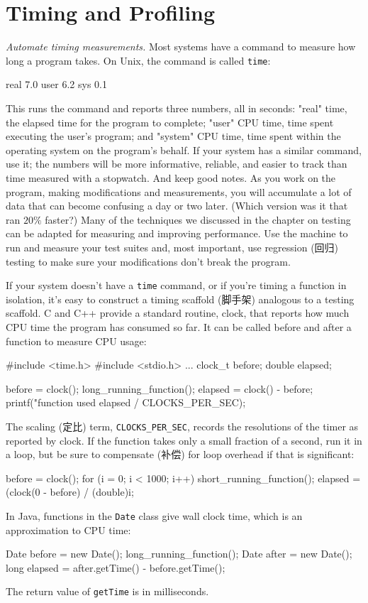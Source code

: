 \section{Timing and Profiling}
\emph{Automate timing measurements.} Most systems have a command to measure
how long a program takes. On Unix, the command is called \verb'time':
\begin{wellcode}
    real    7.0
    user    6.2
    sys     0.1
\end{wellcode}
This runs the command and reports three numbers, all in seconds: "real"
time, the elapsed time for the program to complete; "user" CPU time, time
spent executing the user's program; and "system" CPU time, time spent
within the operating system on the program's behalf. If your system has a
similar command, use it; the numbers will be more informative, reliable,
and easier to track than time measured with a stopwatch. And keep good
notes. As you work on the program, making modifications and measurements,
you will accumulate a lot of data that can become confusing a day or two
later. (Which version was it that ran $20\%$ faster?) Many of the
techniques we discussed in the chapter on testing can be adapted for
measuring and improving performance. Use the machine to run and measure
your test suites and, most important, use regression (回归) testing to make
sure your modifications don't break the program.

If your system doesn't have a \verb'time' command, or if you're timing a
function in isolation, it's easy to construct a timing scaffold (脚手架)
analogous to a testing scaffold. C and C++ provide a standard routine,
clock, that reports how much CPU time the program has consumed so far. It
can be called before and after a function to measure CPU usage:
\begin{wellcode}
    #include <time.h>
    #include <stdio.h>
        ...
        clock_t before;
        double  elapsed;

        before = clock();
        long_running_function();
        elapsed = clock() - before;
        printf("function used %
                elapsed / CLOCKS_PER_SEC);
\end{wellcode}
The scaling (定比) term, \verb'CLOCKS_PER_SEC', records the resolutions of the
timer as reported by clock. If the function takes only a small fraction of
a second, run it in a loop, but be sure to compensate (补偿) for loop
overhead if that is significant:
\begin{wellcode}
    before = clock();
    for (i = 0; i < 1000; i++)
        short_running_function();
    elapsed = (clock(0 - before) / (double)i;
\end{wellcode}
In Java, functions in the \verb'Date' class give wall clock time, which is
an approximation to CPU time:
\begin{wellcode}
    Date before = new Date();
    long_running_function();
    Date after = new Date();
    long elapsed = after.getTime() - before.getTime();
\end{wellcode}
The return value of \verb'getTime' is in milliseconds.

